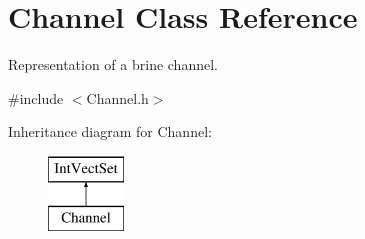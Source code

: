 \hypertarget{class_channel}{\section{Channel Class Reference}
\label{class_channel}
}


Representation of a brine channel.  




{\ttfamily \#include $<$Channel.\-h$>$}

Inheritance diagram for Channel\-:\begin{figure}[H]
\begin{center}
\leavevmode
\includegraphics[height=2.000000cm]{class_channel}
\end{center}
\end{figure}
